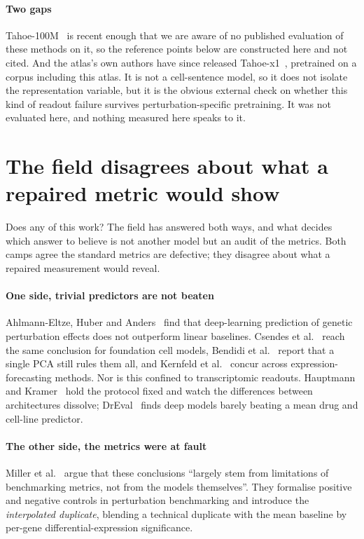 \paragraph{Two gaps} Tahoe-100M~\cite{tahoe100m} is recent enough that we are
aware of no published evaluation of these methods on it, so the reference points
below are constructed here and not cited. And the atlas's own authors have since
released Tahoe-x1~\cite{tahoex1}, pretrained on a corpus including this atlas.
It is not a cell-sentence model, so it does not isolate the representation
variable, but it is the obvious external check on whether this kind of readout
failure survives perturbation-specific pretraining. It was not evaluated here,
and nothing measured here speaks to it.

\section{The field disagrees about what a repaired metric would show}
\label{sec:lit-dispute}
\framedecl{-}

\begin{question}
Does any of this work? The field has answered both ways, and what decides which
answer to believe is not another model but an audit of the metrics. Both camps
agree the standard metrics are defective; they disagree about what a repaired
measurement would reveal.
\end{question}

\paragraph{One side, trivial predictors are not beaten}
Ahlmann-Eltze, Huber and Anders~\cite{ahlmanneltze} find that deep-learning
prediction of genetic perturbation effects does not outperform linear baselines.
Csendes et al.~\cite{csendes} reach the same conclusion for foundation cell
models, Bendidi et al.~\cite{bendidi} report that a single PCA still rules them
all, and Kernfeld et al.~\cite{kernfeld} concur across expression-forecasting
methods. Nor is this confined to transcriptomic readouts. Hauptmann and
Kramer~\cite{hauptmann} hold the protocol fixed and watch the differences between
architectures dissolve; DrEval~\cite{dreval} finds deep models barely beating a
mean drug and cell-line predictor.

\paragraph{The other side, the metrics were at fault} Miller et
al.~\cite{miller} argue that these conclusions ``largely stem from limitations of
benchmarking metrics, not from the models themselves''. They formalise positive
and negative controls in perturbation benchmarking and introduce the
\emph{interpolated duplicate}, blending a technical duplicate with the mean
baseline by per-gene differential-expression
significance.

